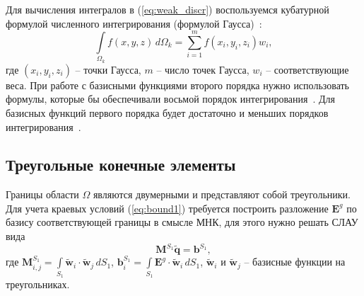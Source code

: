 \documentclass[a4paper,12pt]{article}
\begin{document}
Для вычисления интегралов в (\ref{eq:weak_discr}) воспользуемся кубатурной формулой численного интегрирования (формулой Гаусса)~\citep{misovskih}:
\begin{equation*}
	\int\limits_{\Omega_k} f(x, y, z) \,d\Omega_k = \sum\limits_{i = 1}^m f( x_i , y_i , z_i ) w_i ,
\end{equation*}
где $(x_i , y_i , z_i )$ -- точки Гаусса, $m$ -- число точек Гаусса, $w_i$ -- соответствующие веса. При работе с базисными функциями второго порядка нужно использовать формулы, которые бы обеспечивали восьмой порядок интегрирования~\citep{zhang_integration}. Для базисных функций первого порядка будет достаточно и меньших порядков интегрирования~\citep{misovskih}.


\subsection{Треугольные конечные элементы}

Границы области $\Omega$ являются двумерными и представляют собой треугольники. Для учета краевых условий (\ref{eq:bound1}) требуется построить разложение $\mathbf{E}^g$ по базису соответствующей границы в смысле МНК, для этого нужно решать СЛАУ вида
\begin{equation}
	\mathbf{M}^{S_1} \tilde{\mathbf{q}} = \mathbf{b}^{S_1} ,
	\label{eq:bound_mnk}
\end{equation}
где $\displaystyle \mathbf{M}^{S_1}_{i,j} = \int\limits_{S_1} \tilde{\mathbf{w}}_i \cdot \tilde{\mathbf{w}}_j \,d S_1$, $\displaystyle \mathbf{b}^{S_1}_{i} = \int\limits_{S_1} \mathbf{E}^g \cdot \tilde{\mathbf{w}}_i \,d S_1$, $\tilde{\mathbf{w}}_i$ и $\tilde{\mathbf{w}}_j$ -- базисные функции на треугольниках.
\end{document}
